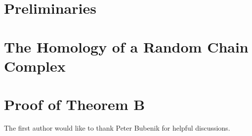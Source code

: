 \documentclass [smallcondensed, referee] {svjour3}
\begin{document}
\section{Preliminaries}

\section{The Homology of a Random Chain Complex}\label{SecCondComp}

\section{Proof of Theorem B}


\begin{acknowledgements}
The first author would like to thank Peter Bubenik for helpful discussions.
\end{acknowledgements}



\end{document}
